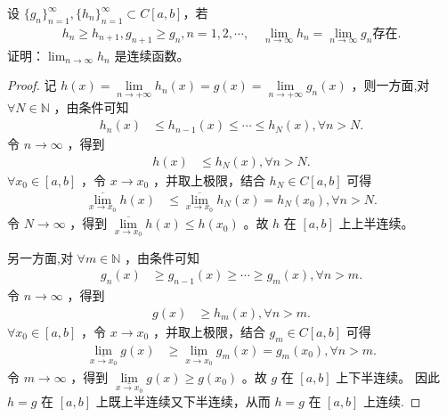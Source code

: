 \documentclass[../../main.tex]{subfiles}%
\begin{document}
\begin{example}
设 $\{g_n\}_{n=1}^{\infty}, \{h_n\}_{n=1}^{\infty} \subset C[a,b]$，若
\begin{align*}
h_n \geqslant  h_{n+1}, g_{n+1} \geqslant  g_n, n = 1, 2, \cdots, \quad
\lim_{n \to \infty} h_n = \lim_{n \to \infty} g_n \text{存在}.
\end{align*}
证明：$\lim_{n \to \infty} h_n$ 是连续函数。
\end{example}
\begin{proof}

记 $h\left( x \right) =\underset{n\rightarrow +\infty}{\lim}h_n\left( x \right) =g\left( x \right) =\underset{n\rightarrow +\infty}{\lim}g_n\left( x \right)$ ，则一方面,对 $\forall N\in \mathbb{N}$ ，由条件可知
\begin{align*}
h_n\left( x \right) &\leqslant h_{n-1}\left( x \right) \leqslant \cdots \leqslant h_N\left( x \right) ,\forall n>N.
\end{align*}
令 $n\rightarrow \infty$ ，得到
\begin{align*}
h\left( x \right) &\leqslant h_N\left( x \right) ,\forall n>N.
\end{align*}
$\forall x_0\in \left[ a,b \right]$ ，令 $x\rightarrow x_0$ ，并取上极限，结合 $h_N\in C\left[ a,b \right]$ 可得
\begin{align*}
\underset{x\rightarrow x_0}{\overline{\lim }}h\left( x \right) &\leqslant \underset{x\rightarrow x_0}{\overline{\lim }}h_N\left( x \right) =h_N\left( x_0 \right) ,\forall n>N.
\end{align*}
令 $N\rightarrow \infty$ ，得到 $\underset{x\rightarrow x_0}{\overline{\lim }}h\left( x \right) \leqslant h\left( x_0 \right)$ 。故 $h$ 在 $\left[ a,b \right]$ 上上半连续。

另一方面,对 $\forall m\in \mathbb{N}$ ，由条件可知
\begin{align*}
g_n\left( x \right) &\geqslant g_{n-1}\left( x \right) \geqslant \cdots \geqslant g_m\left( x \right) ,\forall n>m.
\end{align*}
令 $n\rightarrow \infty$ ，得到
\begin{align*}
g\left( x \right) &\geqslant h_m\left( x \right) ,\forall n>m.
\end{align*}
$\forall x_0\in \left[ a,b \right]$ ，令 $x\rightarrow x_0$ ，并取上极限，结合 $g_m\in C\left[ a,b \right]$ 可得
\begin{align*}
\underset{x\rightarrow x_0}{\underline{\lim }}g\left( x \right) &\geqslant \underset{x\rightarrow x_0}{\underline{\lim }}g_m\left( x \right) =g_m\left( x_0 \right) ,\forall n>m.
\end{align*}
令 $m\rightarrow \infty$ ，得到 $\underset{x\rightarrow x_0}{\underline{\lim }}g\left( x \right) \geqslant g\left( x_0 \right)$ 。故 $g$ 在 $\left[ a,b \right]$ 上下半连续。
因此 $h=g$ 在 $\left[ a,b \right]$ 上既上半连续又下半连续，从而 $h=g$ 在 $\left[ a,b \right]$ 上连续.

\end{proof}
\end{document}
